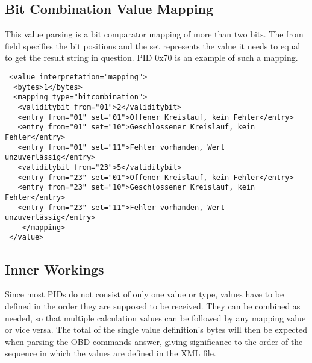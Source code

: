 \subsection{Bit Combination Value Mapping}

This value parsing is a bit comparator mapping of more than two bits. The from field specifies the bit positions and the set represents the 
value it needs to equal to get the result string in question. PID 0x70 is an example of such a mapping.

\begin{verbatim}
 <value interpretation="mapping">
  <bytes>1</bytes>
  <mapping type="bitcombination">
   <validitybit from="01">2</validitybit>
   <entry from="01" set="01">Offener Kreislauf, kein Fehler</entry>
   <entry from="01" set="10">Geschlossener Kreislauf, kein Fehler</entry>
   <entry from="01" set="11">Fehler vorhanden, Wert unzuverlässig</entry>
   <validitybit from="23">5</validitybit>
   <entry from="23" set="01">Offener Kreislauf, kein Fehler</entry>
   <entry from="23" set="10">Geschlossener Kreislauf, kein Fehler</entry>
   <entry from="23" set="11">Fehler vorhanden, Wert unzuverlässig</entry>
    </mapping>    
 </value>
\end{verbatim}

\subsection{Inner Workings}

Since most PIDs do not consist of only one value or type, values have to be defined in the order they are supposed to be received. They can be 
combined as needed, so that multiple calculation values can be followed by any mapping value or vice versa. The total of the single value 
definition’s bytes will then be expected when parsing the OBD commands answer, giving significance to the order of the sequence in which the 
values are defined in the XML file.

